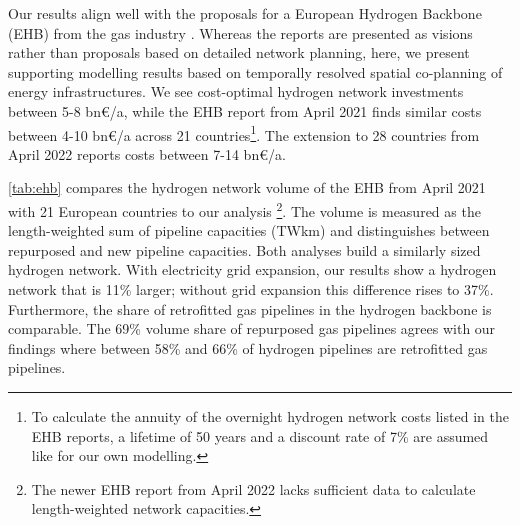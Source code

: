Our results align well with the proposals for a European Hydrogen Backbone (EHB)
from the gas industry
\cite{gasforclimateEuropeanHydrogen2020,gasforclimateExtendingEuropean2021,gasforclimateEuropeanHydrogen2021,gasforclimateEuropeanHydrogen2022}.
Whereas the reports are presented as visions rather than proposals based on
detailed network planning, here, we present supporting modelling results based
on temporally resolved spatial co-planning of energy infrastructures. We see
cost-optimal hydrogen network investments between 5-8 bn\euro/a, while the EHB
report from April 2021 \cite{gasforclimateExtendingEuropean2021} finds similar
costs between 4-10 bn\euro/a across 21 countries\footnote{To calculate the
annuity of the overnight hydrogen network costs listed in the EHB reports, a
lifetime of 50 years and a discount rate of 7\% are assumed like for our own
modelling.}. The extension to 28 countries from April 2022
\cite{gasforclimateEuropeanHydrogen2022} reports costs between 7-14 bn\euro/a.


\cref{tab:ehb} compares the hydrogen network volume of the EHB from April 2021 with 21 European countries
to our analysis \cite{gasforclimateExtendingEuropean2021}\footnote{The newer
EHB report from April 2022 \cite{gasforclimateEuropeanHydrogen2022} lacks sufficient
data to calculate length-weighted network capacities.}. The volume is measured
as the length-weighted sum of pipeline capacities (TWkm) and distinguishes
between repurposed and new pipeline capacities. Both analyses build a similarly
sized hydrogen network. With electricity grid expansion, our results show a
hydrogen network that is 11\% larger; without grid expansion this difference
rises to 37\%. Furthermore, the share of retrofitted gas pipelines in the
hydrogen backbone is comparable. The 69\% volume share of repurposed gas
pipelines \cite{gasforclimateExtendingEuropean2021} agrees with our findings
where between 58\% and 66\% of hydrogen pipelines are retrofitted gas pipelines.

